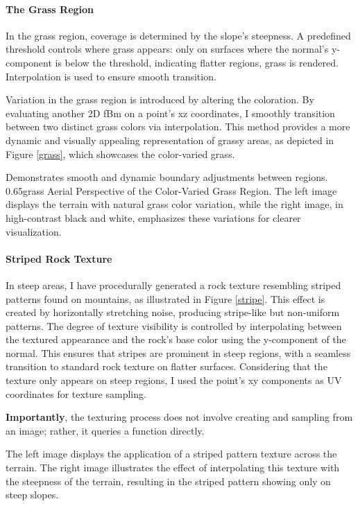 \paragraph{The Grass Region}
In the grass region, coverage is determined by the slope's steepness. A predefined threshold controls where grass appears: only on surfaces where the normal's y-component is below the threshold, indicating flatter regions, grass is rendered. Interpolation is used to ensure smooth transition. 

Variation in the grass region is introduced by altering the coloration. By evaluating another 2D fBm on a point's xz coordinates, I smoothly transition between two distinct grass colors via interpolation. This method provides a more dynamic and visually appealing representation of grassy areas, as depicted in Figure \ref{grass}, which showcases the color-varied grass.

{Demonstrates smooth and dynamic boundary adjustments between regions.}
{0.65}{grass}
{Aerial Perspective of the Color-Varied Grass Region. The left image displays the terrain with natural grass color variation, while the right image, in high-contrast black and white, emphasizes these variations for clearer visualization.}

\paragraph{Striped Rock Texture}
In steep areas, I have procedurally generated a rock texture resembling striped patterns found on mountains, as illustrated in Figure \ref{stripe}. This effect is created by horizontally stretching noise, producing stripe-like but non-uniform patterns. The degree of texture visibility is controlled by interpolating between the textured appearance and the rock's base color using the y-component of the normal. This ensures that stripes are prominent in steep regions, with a seamless transition to standard rock texture on flatter surfaces. Considering that the texture only appears on steep regions, I used the point's xy components as UV coordinates for texture sampling. 

\textbf{Importantly}, the texturing process does not involve creating and sampling from an image; rather, it queries a function directly.

{The left image displays the application of a striped pattern texture across the terrain. The right image illustrates the effect of interpolating this texture with the steepness of the terrain, resulting in the striped pattern showing only on steep slopes.}



